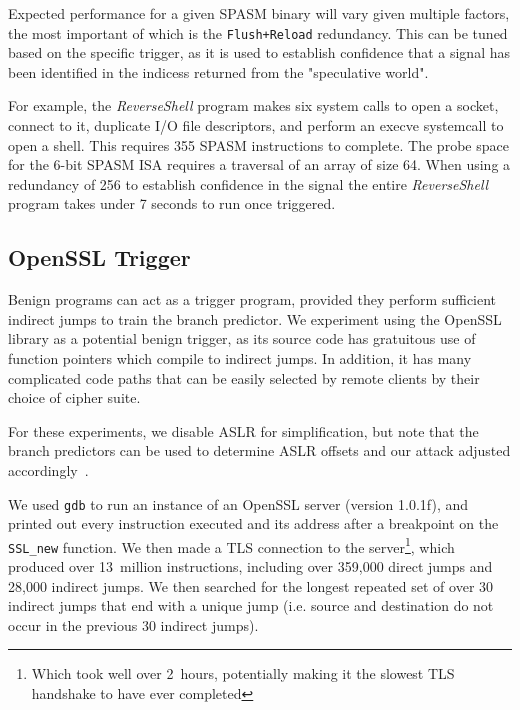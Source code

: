 Expected performance for a given SPASM binary will vary given multiple factors, 
the most important of which is the \texttt{Flush+Reload} redundancy. This can be tuned
based on the specific trigger, as it is used to establish confidence that a signal 
has been identified in the indicess returned from the "speculative world". 


For example, the \textit{ReverseShell} program makes six system calls to open a socket,
connect to it, duplicate I/O file descriptors, and perform an execve
systemcall to open a shell. This requires 355 SPASM instructions to complete. 
The probe space for the 6-bit SPASM ISA requires a traversal of an array of size 64.
When using a redundancy of 256 to establish confidence in the signal the entire 
\textit{ReverseShell} program takes under 7 seconds to run once triggered. 



\FigSpasmModel

\subsection{OpenSSL Trigger}
\label{subsec:openssl}

Benign programs can act as a trigger program, provided they perform sufficient
indirect jumps to train the branch predictor. We experiment using the OpenSSL
library as a potential benign trigger, as its source code has gratuitous use of
function pointers which compile to indirect jumps. In addition, it has many
complicated code paths that can be easily selected by remote clients by their
choice of cipher suite.

For these experiments, we disable ASLR for simplification, but note that the
branch predictors can be used to determine ASLR offsets and our attack adjusted
accordingly~\cite{evtyushkin2016jump}.

We used \texttt{gdb} to run an instance of an OpenSSL server (version 1.0.1f),
and printed out every instruction executed and its address after a breakpoint on
the \texttt{SSL\_new} function. We then made a TLS connection to the
server\footnote{Which took well over 2~hours, potentially making it the slowest
TLS handshake to have ever completed},
which produced over 13~million instructions, including over 359,000 direct jumps
and 28,000 indirect jumps. We then searched for the longest repeated set of over
30 indirect jumps that end with a unique jump (i.e. source and destination do
not occur in the previous 30 indirect jumps).

